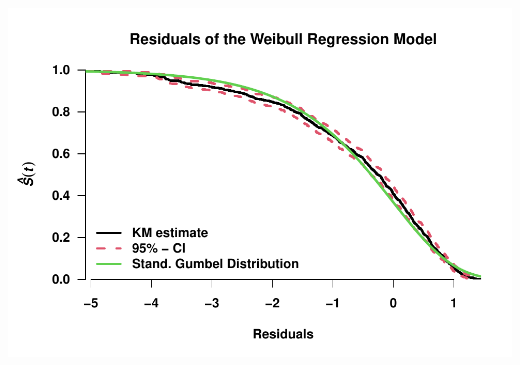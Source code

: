 \documentclass[
]{article}
\begin{document}
\includegraphics{practical_files/figure-latex/unnamed-chunk-13-2.pdf}
\end{document}
